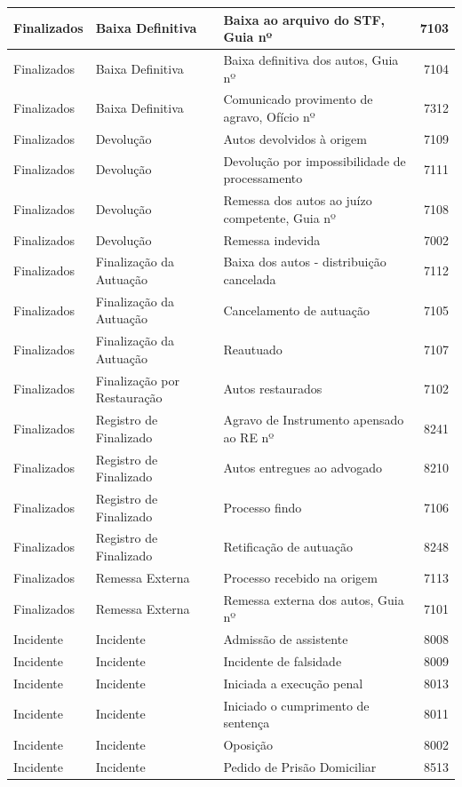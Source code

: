 \documentclass[
]{book}
\begin{document}
\begin{tabular}{l|l|l|r}
\hline
Finalizados & Baixa Definitiva & Baixa ao arquivo do STF, Guia nº & 7103\\
\hline
Finalizados & Baixa Definitiva & Baixa definitiva dos autos, Guia nº & 7104\\
\hline
Finalizados & Baixa Definitiva & Comunicado provimento de agravo, Ofício nº & 7312\\
\hline
Finalizados & Devolução & Autos devolvidos à origem & 7109\\
\hline
Finalizados & Devolução & Devolução por impossibilidade de processamento & 7111\\
\hline
Finalizados & Devolução & Remessa dos autos ao juízo competente, Guia nº & 7108\\
\hline
Finalizados & Devolução & Remessa indevida & 7002\\
\hline
Finalizados & Finalização da Autuação & Baixa dos autos - distribuição cancelada & 7112\\
\hline
Finalizados & Finalização da Autuação & Cancelamento de autuação & 7105\\
\hline
Finalizados & Finalização da Autuação & Reautuado & 7107\\
\hline
Finalizados & Finalização por Restauração & Autos restaurados & 7102\\
\hline
Finalizados & Registro de Finalizado & Agravo de Instrumento apensado ao RE nº & 8241\\
\hline
Finalizados & Registro de Finalizado & Autos entregues ao advogado & 8210\\
\hline
Finalizados & Registro de Finalizado & Processo findo & 7106\\
\hline
Finalizados & Registro de Finalizado & Retificação de autuação & 8248\\
\hline
Finalizados & Remessa Externa & Processo recebido na origem & 7113\\
\hline
Finalizados & Remessa Externa & Remessa externa dos autos, Guia nº & 7101\\
\hline
Incidente & Incidente & Admissão de assistente & 8008\\
\hline
Incidente & Incidente & Incidente de falsidade & 8009\\
\hline
Incidente & Incidente & Iniciada a execução penal & 8013\\
\hline
Incidente & Incidente & Iniciado o cumprimento de sentença & 8011\\
\hline
Incidente & Incidente & Oposição & 8002\\
\hline
Incidente & Incidente & Pedido de Prisão Domiciliar & 8513\\

\end{tabular}
\end{document}
